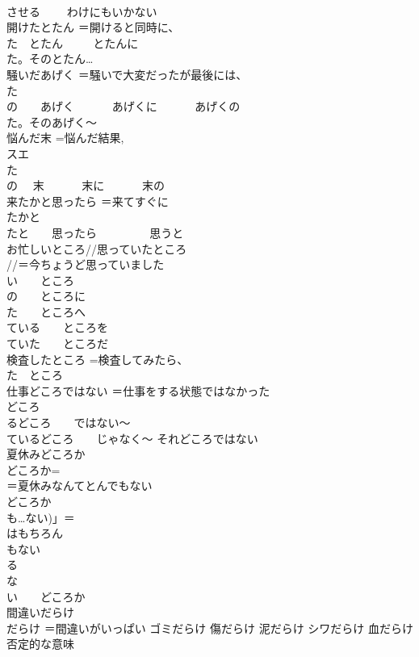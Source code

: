 \documentclass[8pt]{extreport}
\begin{document}
\begin{CJK}{UTF8}{min}
\\	させる　　 わけにもいかない
\\	開けたとたん	＝開けると同時に、
\\	た　とたん 　　 とたんに 
\\	た。そのとたん… 
\\	騒いだあげく	＝騒いで大変だったが最後には、
\\	た 
\\	の　　あげく 　　　あげくに 　　　あげくの
\\	た。そのあげく〜
\\	悩んだ末	=悩んだ結果, 
\\	スエ 
\\	た 
\\	の　 末 　　　末に 　　　末の
\\	来たかと思ったら	＝来てすぐに 
\\	たかと 
\\	たと　　思ったら 　　　 　思うと
\\	お忙しいところ//思っていたところ	
\\	//＝今ちょうど思っていました 
\\	い　　ところ 
\\	の　　ところに 
\\	た　　ところへ 
\\	ている　　ところを 
\\	ていた　　ところだ
\\	検査したところ	=検査してみたら、
\\	た　ところ
\\	仕事どころではない	＝仕事をする状態ではなかった 
\\	どころ 
\\	るどころ　　ではない〜 
\\	ているどころ　　じゃなく〜 それどころではない
\\	夏休みどころか	
\\	どころか=
\\	＝夏休みなんてとんでもない 
\\	どころか
\\	も…ない)」＝
\\	はもちろん
\\	もない 
\\	る 
\\	な 
\\	い　　どころか
\\	間違いだらけ	
\\	だらけ ＝間違いがいっぱい ゴミだらけ 傷だらけ 泥だらけ シワだらけ 血だらけ 
\\	否定的な意味

\end{CJK}
\end{document}
